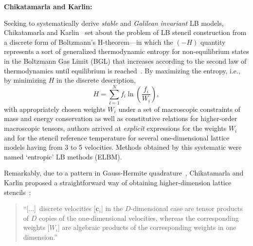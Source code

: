     \vspace{2.0mm}\noindent\textbf{Chikatamarla and Karlin:}\vspace{1.0mm}

    Seeking  to  systematically   derive   \emph{stable}   and   \emph{Galilean   invariant}   LB   models,   Chikatamarla   and
    Karlin~\cite{2006-ChikatamarlaSS+KarlinIV-PhysRevLett} set about the problem of LB stencil construction from a discrete form
    of Boltzmann's H-theorem---in which the  $(-H)$  quantity  represents  a  sort  of  generalized  thermodynamic  entropy  for
    non-equilibrium states in the Boltzmann Gas Limit (BGL) that increases according to the second law of  thermodynamics  until
    equilibrium is reached~\cite{2011-HarrisS-Dover}. By maximizing the  entropy,  i.e.,  by  minimizing  $H$  in  the  discrete
    description,
    \begin{equation}
        H = \sum_{i=1}^{N}f_i\ln\left(\frac{f_i}{W_i}\right),
    \end{equation}
    \noindent with appropriately chosen weights $W_i$ under a set of macroscopic constraints of mass and energy conservation  as
    well as constitutive relations for higher-order macroscopic tensors, authors arrived at \emph{explicit} expressions for  the
    weights $W_i$ and for the stencil reference temperature for several one-dimensional  lattice  models  having  from  3  to  5
    velocities. Methods obtained by this systematic were named `entropic' LB methods (ELBM).

    Remarkably, due to a pattern in Gauss-Hermite  quadrature~\cite{2003-AnsumaliS+OettingerHC-EuroPhysLett},  Chikatamarla  and
    Karlin       proposed       a       straightforward       way       of       obtaining       higher-dimension        lattice
    stencils~\cite{2006-ChikatamarlaSS+KarlinIV-PhysRevLett}:

    \begin{quote}
        \swshape
        ``[...]~discrete velocities [$\mathbf{c}_i$] in the $D$-dimensional case are  tensor  products  of  $D$  copies  of  the
        one-dimensional velocities, whereas the corresponding weights  [$W_i$]  are  algebraic  products  of  the  corresponding
        weights in one dimension.''
    \end{quote}

